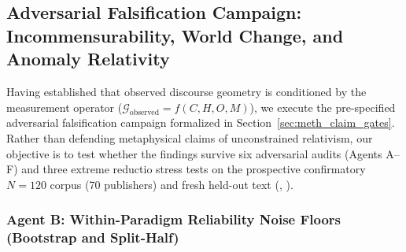 \subsection{Adversarial Falsification Campaign: Incommensurability, World Change, and Anomaly Relativity}
\label{sec:kuhnian_paradigms}

Having established that observed discourse geometry is conditioned by the measurement operator ($\mathcal{G}_{\text{observed}} = f(C, H, O, M)$), we execute the pre-specified adversarial falsification campaign formalized in Section~\ref{sec:meth_claim_gates}. Rather than defending metaphysical claims of unconstrained relativism, our objective is to test whether the findings survive six adversarial audits (Agents A--F) and three extreme reductio stress tests on the prospective confirmatory $N=120$ corpus (70 publishers) and fresh held-out text (, ).

\subsubsection{Agent B: Within-Paradigm Reliability Noise Floors (Bootstrap and Split-Half)}

